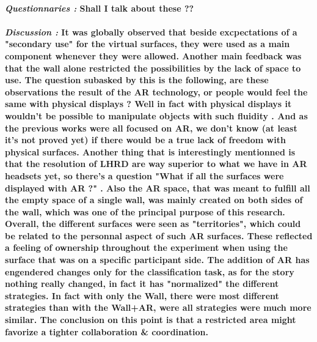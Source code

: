 \documentclass{article}
\begin{document}
    \paragraph{ \textit{Questionnaries :}
                \newline
                \indent \indent \textnormal{Shall I talk about these ??}}
    
    \paragraph{ \textit{Discussion :} 
                \newline
                \indent \indent \textnormal{It was globally observed that beside excpectations of a "secondary use" for the virtual surfaces, they were used as a main component whenever they were 
                allowed. Another main feedback was that the wall alone restricted the possibilities by the lack of space to use. The question subasked by this is the following, are these observations 
                the result of the AR technology, or people would feel the same with physical displays ? Well in fact with physical displays it wouldn't be possible to manipulate objects with such fluidity
                . And as the previous works were all focused on AR, we don't know (at least it's not proved yet) if there would be a true lack of freedom with physical surfaces. Another thing that is interestingly
                mentionned is that the resolution of LHRD are way superior to what we have in AR headsets yet, so there's a question "What if all the surfaces were displayed with AR ?" .}
                \newline
                \indent \indent \textnormal{Also the AR space, that was meant to fulfill all the empty space of a single wall, was mainly created on both sides of the wall, which was one of the principal purpose of this research.
                Overall, the different surfaces were seen as "territories", which could be related to the personnal aspect of such AR surfaces. These reflected a feeling of ownership throughout the experiment when using the surface
                that was on a specific participant side.}
                \newline
                \indent \indent \textnormal{The addition of AR has engendered changes only for the classification task, as for the story nothing really changed, in fact it has "normalized" the different strategies. In fact with only 
                the Wall, there were most different strategies than with the Wall+AR, were all strategies were much more similar. The conclusion on this point is that a restricted area might favorize a tighter collaboration \& coordination.}
}
\end{document}
